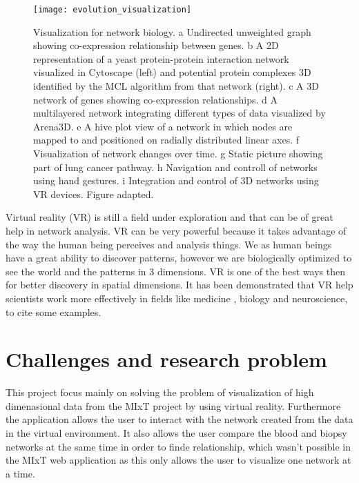 \begin{figure}[h!]
    \newlength{\tempheight}
    \setlength{\tempheight}{15ex}
    \centering%
    \texttt{[image: evolution\_visualization]}
    \caption{Visualization for network biology. a Undirected unweighted graph showing co-expression relationship between genes. b A 2D representation of a yeast protein-protein interaction network visualized in Cytoscape (left) and potential protein complexes 3D identified by the MCL algorithm from that network (right). c A 3D network of genes showing co-expression relationships. d A multilayered network integrating different types of data visualized by Arena3D. e A hive plot view of a network in which nodes are mapped to and positioned on radially distributed linear axes. f Visualization of network changes over time. g Static picture showing part of lung cancer pathway. h Navigation and controll of networks using hand gestures. i Integration and control of 3D networks using VR devices. Figure adapted\cite{pavlopoulos_malliarakis_papanikolaou_theodosiou_enright_iliopoulos_2015}.}
    \label{fig:network_biology_evolution}
\end{figure}%

Virtual reality (VR) is still a field under exploration and that can be of great help in network analysis. VR can be very powerful because it takes advantage of the way the human being perceives and analysis things. We as human beings have a great ability to discover patterns, however we are biologically optimized to see the world and the patterns in 3 dimensions. VR is one of the best ways then for better discovery in spatial dimensions. It has been demonstrated that VR help scientists work more effectively in fields like medicine \cite{Laver11}\cite{xia_ip_samman_wong_gateno_wang_yeung_kot_tideman_2001}\cite{brain_damage_rehab}, biology\cite{10.1093/bioinformatics/bti581}\cite{thorley_lawson_duca_shapiro_2008} and neuroscience\cite{bohil_alicea_biocca_2011}\cite{minderer_harvey_donato_moser_2016}, to cite some examples.


\section{Challenges and research problem}
This project focus mainly on solving the problem of visualization of high dimenasional data from the MIxT project by using virtual reality. Furthermore the application allows the user to interact with the network created from the data in the virtual environment. It also allows the user compare the blood and biopsy networks at the same time in order to finde relationship, which wasn't possible in the MIxT web application as this only allows the user to visualize one network at a time.

